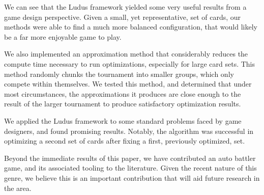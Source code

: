 We can see that the {\sc Ludus} framework yielded some very useful results from a game design perspective. Given a small, yet representative, set of cards, our methods were able to find a much more balanced configuration, that would likely be a far more enjoyable game to play.

We also implemented an approximation method that considerably reduces the compute time necessary to run optimizations, especially for large card sets. This method randomly chunks the tournament into smaller groups, which only compete within themselves. We tested this method, and determined that under most circumstances, the approximations it produces are close enough to the result of the larger tournament to produce satisfactory optimization results. 

We applied the {\sc Ludus} framework to some standard problems faced by game designers, and found promising results. Notably, the algorithm was successful in optimizing a second set of cards after fixing a first, previously optimized, set.

Beyond the immediate results of this paper, we have contributed an auto battler game, and its associated tooling to the literature. Given the recent nature of this genre, we believe this is an important contribution that will aid future research in the area.
